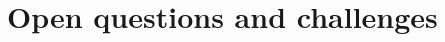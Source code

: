 \documentclass{beamer}
\newcommand\m[1]{\ensuremath{\mathcal{#1}}\xspace}
\newcommand\formulac{\ensuremath{\m{C} }\xspace}
\renewcommand\emph[1]{{\color{vuborange}#1}}
\newcommand\subsetT{\m{\mathcal{S}}}
\newcommand\call[1]{\m{\textsc{#1}}}
\newcommand\setstohit{\m{\mathcal{H}}}
\newcommand\sat{\call{SAT}}
\newcommand\corrss{\call{Correction-Subsets}}
\begin{document}
%
			
			
			\section{Open questions and challenges}
			
			 \begin{frame}
				\tableofcontents[currentsection]
			\end{frame}			
			
\end{document}
